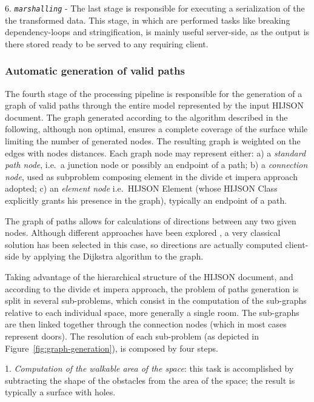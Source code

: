  6. \textit{\texttt{marshalling}} - The last stage is responsible for executing
 a serialization of the the transformed data. This stage, in which are performed tasks like breaking
 dependency-loops and stringification, is
 mainly useful  server-side, as the output is there stored ready to be
 served to any requiring client.

\subsubsection{Automatic generation of valid paths}\label{automatic-generation-of-valid-paths}

The fourth stage of the processing pipeline is responsible for the
generation of a graph of valid paths through the entire model
represented by the input HIJSON document. The graph generated according
to the algorithm described in the following, although non optimal,
ensures a complete coverage of the surface while limiting the number of
generated nodes. The resulting graph is weighted on the edges with nodes
distances. Each graph node may represent either: a) a \emph{standard path node}, i.e.~a junction node or possibly an endpoint of a path; b) a \emph{connection node}, used as subproblem composing element in the divide et impera approach adopted; c) an \emph{element node} i.e.~HIJSON Element (whose HIJSON Class explicitly grants his presence in the graph), typically an endpoint of a path.

The graph of paths allows for calculations of directions between any two given
nodes. Although different approaches have been explored \cite{6999103}, 
a very classical solution has been selected in this case, so directions 
are actually computed client-side by applying the Dijkstra algorithm to the graph. 

Taking advantage of the hierarchical structure of the HIJSON document,
and according to the divide et impera approach, the problem of 
paths generation is split in several sub-problems, which consist in
the computation of the sub-graphs relative to each individual space, more generally a single room. The sub-graphs are then linked together through the
connection nodes (which in most cases represent doors). The resolution
of each sub-problem (as depicted in Figure~\ref{fig:graph-generation}), 
is composed by four steps. 

1. \textit{Computation of the walkable area of the space}: this task is
 accomplished by subtracting the shape of the obstacles from the area
 of the space; the result is typically a surface with holes.

